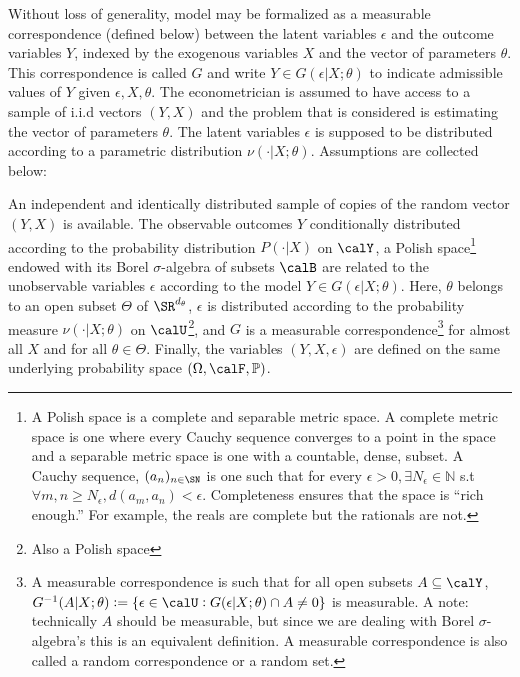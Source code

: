 Without loss of generality, model may be formalized as a measurable correspondence (defined below) between the latent variables $\epsilon$ and the outcome variables $Y$, indexed by the exogenous variables $X$ and the vector of parameters $\theta$. This correspondence is called $G$ and write
$Y\in G(\epsilon | X;\theta)$ to indicate admissible values of $Y$ given $\epsilon, X, \theta$. The econometrician is assumed to have access to a sample of i.i.d vectors $(Y,X)$ and the problem that is considered is estimating the vector of parameters $\theta$. The latent variables $\epsilon$ is supposed to be distributed according to a parametric distribution $\nu(\cdot|X;\theta)$. Assumptions are collected below:
\newpage
\begin{assumption}
	\label{assm:GH-1}
	An independent and identically distributed sample of copies of the random vector $(Y,X)$ is available. The observable outcomes $Y$ conditionally distributed according to the probability distribution $P(\cdot|X)$ on $\calY$, a Polish space\footnote{A Polish space is a complete and separable metric space. A complete metric space is one where every Cauchy sequence converges to a point in the space and a separable metric space is one with a countable, dense, subset. A Cauchy sequence, $(a_n)_{n\in \SN}$ is one such that for every $\epsilon > 0, \exists N_\epsilon \in \mathbb{N}$ s.t $\forall m,n \geq N_\epsilon, d(a_m, a_n) < \epsilon$. Completeness ensures that the space is ``rich enough.'' For example, the reals are complete but the rationals are not.}
	endowed with its Borel $\sigma$-algebra of subsets $\calB$ are related to the unobservable variables $\epsilon$ according to the model $Y\in G(\epsilon| X;\theta)$. Here, $\theta$ belongs to an open subset $\Theta$ of $\SR^{d_\theta}$, $\epsilon$ is distributed according to the probability measure $\nu(\cdot|X;\theta)$ on $\calU$\footnote{Also a Polish space},
	and $G$ is a measurable correspondence\footnote{A measurable correspondence is such that for all open subsets $A \subseteq \calY$, $G^{-1}(A|X;\theta) := \{\epsilon\in\calU: G(\epsilon|X;\theta) \cap A \neq 0\}$ is measurable. A note: technically $A$ should be measurable, but since we are dealing with Borel $\sigma$-algebra's this is an equivalent definition. A measurable correspondence is also called a random correspondence or a random set.}
	for almost all $X$ and for all $\theta \in \Theta$. Finally, the variables $(Y,X,\epsilon)$ are defined on the same underlying probability space $(\Omega, \calF, \mathbb{P})$.
\end{assumption}

